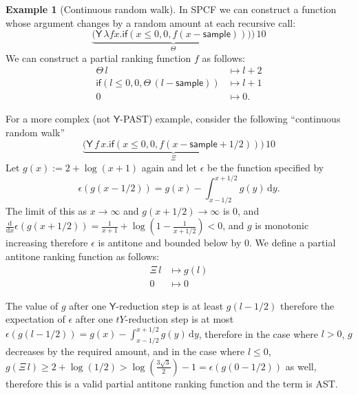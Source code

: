 \documentclass{article}
\newcommand{\tY}{\mathsf{Y}}
\newcommand{\tif}[3]{\mathsf{if}(#1, #2, #3)} %
\newcommand{\tsample}{\mathsf{sample}}
\theoremstyle{definition}
\newtheorem{example}{Example}
\theoremstyle{lemma}
\theoremstyle{remark}
\begin{document}
\begin{example}[Continuous random walk]\label{ex:raven complex}
In SPCF we can construct a function whose argument changes by a random amount at each recursive call:
\[
\underbrace{\big
(\tY \, \lambda f x . \tif{x \leq 0}{0}{f(x - \tsample))} \big)}_{\Theta} \, 10
\]
We can construct a partial ranking function $f$ as follows:
\begin{align*}
\Theta \, l 
&\mapsto 
l + 2
\\
\tif{l \leq 0}{0}{\Theta \, (l - \tsample)}
&\mapsto
l + 1
\\
0 &\mapsto 0.
\end{align*}

For a more complex (not $\tY$-PAST) example, consider the following ``continuous random walk''
\[
\underbrace{\big
(\tY \, f \, x . \tif{x \leq 0}{0}{f(x - \tsample + 1/2)} \big)}_{\Xi} \, 10
\]
Let $g(x) := 2 + \log(x + 1)$ again and let $\epsilon$ be the function specified by
\[
\epsilon(g(x-1/2)) = g(x) - \int_{x-1/2}^{x+1/2}g(y) \, \mathrm d y.
\]
The limit of this as $x \to \infty$ and $g(x+1/2) \to \infty$ is 0, and $\frac {\mathrm d}{\mathrm dx} \epsilon(g(x+1/2)) = \frac 1 {x+1} + \log(1 - \frac 1 {x + 1/2}) < 0$, and $g$ is monotonic increasing therefore $\epsilon$ is antitone and bounded below by 0.
We define a partial antitone ranking function as follows:
\begin{align*}
\Xi \, l 
&\mapsto 
g(l)
\\
0 &\mapsto 0
\end{align*}
\end{example}
The value of $g$ after one $\tY$-reduction step is at least $g(l-1/2)$ therefore the expectation of $\epsilon$ after one $tY$-reduction step is at most $\epsilon(g(l-1/2)) = g(x) - \int_{x-1/2}^{x+1/2}g(y) \, \mathrm d y$, therefore in the case where $l > 0$, $g$ decreases by the required amount, and in the case where $l \leq 0$, $g(\Xi \, l) \geq 2 + \log(1/2) > \log(\frac{3 \sqrt 3} 2) - 1 = \epsilon(g(0-1/2))$ as well, therefore this is a valid partial antitone ranking function and the term is AST.
\end{document}
